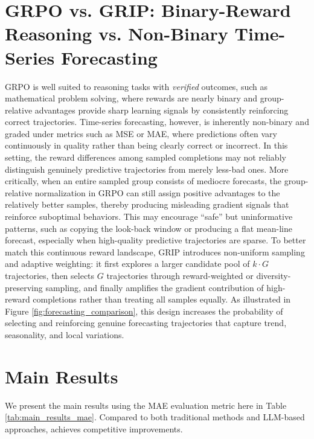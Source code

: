 \section{GRPO vs. GRIP: Binary-Reward Reasoning vs. Non-Binary Time-Series Forecasting} \label{section:po.vs.ip}
GRPO is well suited to reasoning tasks with \emph{verified} outcomes, such as mathematical problem solving, where rewards are nearly binary and group-relative advantages provide sharp learning signals by consistently reinforcing correct trajectories. Time-series forecasting, however, is inherently non-binary and graded under metrics such as MSE or MAE, where predictions often vary continuously in quality rather than being clearly correct or incorrect. In this setting, the reward differences among sampled completions may not reliably distinguish genuinely predictive trajectories from merely less-bad ones. More critically, when an entire sampled group consists of mediocre forecasts, the group-relative normalization in GRPO can still assign positive advantages to the relatively better samples, thereby producing misleading gradient signals that reinforce suboptimal behaviors. This may encourage ``safe'' but uninformative patterns, such as copying the look-back window or producing a flat mean-line forecast, especially when high-quality predictive trajectories are sparse. To better match this continuous reward landscape, GRIP introduces non-uniform sampling and adaptive weighting: it first explores a larger candidate pool of $k\!\cdot\!G$ trajectories, then selects $G$ trajectories through reward-weighted or diversity-preserving sampling, and finally amplifies the gradient contribution of high-reward completions rather than treating all samples equally. As illustrated in Figure \ref{fig:forecasting_comparison}, this design increases the probability of selecting and reinforcing genuine forecasting trajectories that capture trend, seasonality, and local variations.



\section{Main Results}
We present the main results using the MAE evaluation metric here in Table \ref{tab:main_results_mae}. Compared to both traditional methods and LLM-based approaches, \Ours achieves competitive improvements.


% 
% 



